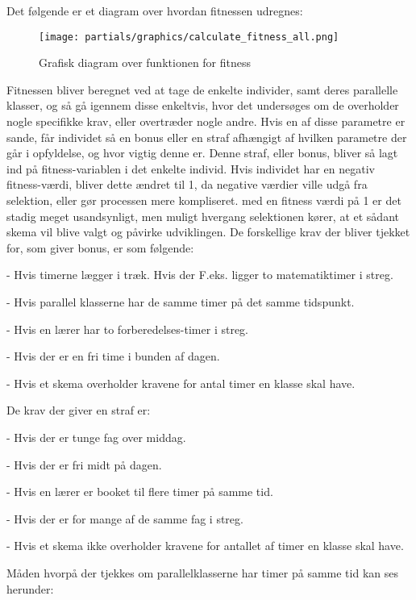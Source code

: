 Det følgende er et diagram over hvordan fitnessen udregnes:
\begin{figure}[!h]
\texttt{[image: partials/graphics/calculate\_fitness\_all.png]}
\caption{Grafisk diagram over funktionen for fitness}
\label{fig:diagramfitness}
\end{figure}

Fitnessen bliver beregnet ved at tage de enkelte individer, samt deres parallelle klasser, og så gå igennem disse enkeltvis, hvor det undersøges om de overholder nogle specifikke krav, eller overtræder nogle andre. Hvis en af disse parametre er sande, får individet så en bonus eller en straf afhængigt af hvilken parametre der går i opfyldelse, og hvor vigtig denne er. Denne straf, eller bonus, bliver så lagt ind på fitness-variablen i det enkelte individ. Hvis individet har en negativ fitness-værdi, bliver dette ændret til 1, da negative værdier ville udgå fra selektion, eller gør processen mere kompliseret. med en fitness værdi på 1 er det stadig meget usandsynligt, men muligt hvergang selektionen kører, at et sådant skema vil blive valgt og påvirke udviklingen.
De forskellige krav der bliver tjekket for, som giver bonus, er som følgende:

   -	Hvis timerne lægger i træk. Hvis der F.eks. ligger to matematiktimer i streg.
   
   -	Hvis parallel klasserne har de samme timer på det samme tidspunkt. 
   
   -	Hvis en lærer har to forberedelses-timer i streg.
   
   -	Hvis der er en fri time i bunden af dagen.
   
   -	Hvis et skema overholder kravene for antal timer en klasse skal have.
   
   
De krav der giver en straf er:

   -	Hvis der er tunge fag over middag.
   
   -	Hvis der er fri midt på dagen.
   
   -	Hvis en lærer er booket til flere timer på samme tid.
   
   -	Hvis der er for mange af de samme fag i streg.
   
   -	Hvis et skema ikke overholder kravene for antallet af timer en klasse skal have.

Måden hvorpå der tjekkes om parallelklasserne har timer på samme tid kan ses herunder:


